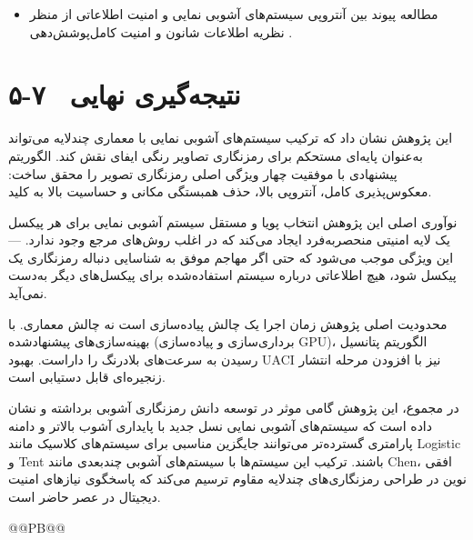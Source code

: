 \begin{itemize}
    \item مطالعه پیوند بین آنتروپی سیستم‌های آشوبی نمایی و امنیت اطلاعاتی از منظر نظریه اطلاعات شانون و امنیت کامل‌پوشش‌دهی .
\end{itemize}

\section{۵-۷  نتیجه‌گیری نهایی}

این پژوهش نشان داد که ترکیب سیستم‌های آشوبی نمایی با معماری چندلایه می‌تواند به‌عنوان پایه‌ای مستحکم برای رمزنگاری تصاویر رنگی ایفای نقش کند. الگوریتم پیشنهادی با موفقیت چهار ویژگی اصلی رمزنگاری تصویر را محقق ساخت: معکوس‌پذیری کامل، آنتروپی بالا، حذف همبستگی مکانی و حساسیت بالا به کلید.

نوآوری اصلی این پژوهش انتخاب پویا و مستقل سیستم آشوبی نمایی برای هر پیکسل ‎---‎ یک لایه امنیتی منحصربه‌فرد ایجاد می‌کند که در اغلب روش‌های مرجع وجود ندارد. این ویژگی موجب می‌شود که حتی اگر مهاجم موفق به شناسایی دنباله رمزنگاری یک پیکسل شود، هیچ اطلاعاتی درباره سیستم استفاده‌شده برای پیکسل‌های دیگر به‌دست نمی‌آید.

محدودیت اصلی پژوهش  زمان اجرا یک چالش پیاده‌سازی است نه چالش معماری. با بهینه‌سازی‌های پیشنهادشده (برداری‌سازی و پیاده‌سازی ‎GPU‎)، الگوریتم پتانسیل رسیدن به سرعت‌های بلادرنگ را داراست. بهبود ‎UACI‎ نیز با افزودن مرحله انتشار زنجیره‌ای قابل دستیابی است.

در مجموع، این پژوهش گامی موثر در توسعه دانش رمزنگاری آشوبی برداشته و نشان داده است که سیستم‌های آشوبی نمایی نسل جدید با پایداری آشوب بالاتر و دامنه پارامتری گسترده‌تر می‌توانند جایگزین مناسبی برای سیستم‌های کلاسیک مانند ‎Logistic‎ و ‎Tent‎ باشند. ترکیب این سیستم‌ها با سیستم‌های آشوبی چندبعدی مانند  ‎Chen‎،  افقی نوین در طراحی رمزنگاری‌های چندلایه مقاوم ترسیم می‌کند که پاسخگوی نیازهای امنیت دیجیتال در عصر حاضر است.


@@PB@@











